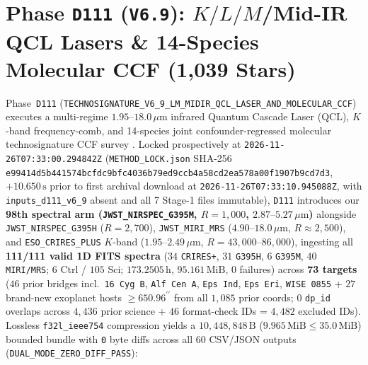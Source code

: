 \documentclass[twocolumn,10pt]{article}
\begin{document}
\section{Phase \texttt{D111} (\texttt{V6.9}): $K/L/M$/Mid-IR QCL Lasers \& 14-Species Molecular CCF (1,039 Stars)}
\label{sec:d111}
Phase~\texttt{D111} (\texttt{TECHNOSIGNATURE\_\allowbreak V6\_9\_\allowbreak LM\_\allowbreak MIDIR\_\allowbreak QCL\_\allowbreak LASER\_\allowbreak AND\_\allowbreak MOLECULAR\_\allowbreak CCF}) executes a multi-regime $1.95\text{--}18.0\,\mu\text{m}$ infrared Quantum Cascade Laser (QCL), $K$-band frequency-comb, and 14-species joint confounder-regressed molecular technosignature CCF survey \cite{Townes1983,HaqqMisra2022,Kaltenegger2021,Dorn2023,Jakobsen2022,Wright2023}. Locked prospectively at \texttt{2026-11-26T07:33:00.294842Z} (\texttt{METHOD\_LOCK.json} SHA-256 \texttt{e99414d5\allowbreak b441574b\allowbreak cfdc9bfc\allowbreak 4036b79e\allowbreak d9ccb4a5\allowbreak 8cd2ea57\allowbreak 8a00f190\allowbreak 7b9cd7d3}, $+10.650\,\text{s}$ prior to first archival download at \texttt{2026-11-26T07:33:10.945088Z}, with \texttt{inputs\_d111\_v6\_9} absent and all 7 Stage-1 files immutable), \texttt{D111} introduces our \textbf{98th spectral arm (\texttt{JWST\_NIRSPEC\_G395M}, $R=1{,}000$, $2.87\text{--}5.27\,\mu\text{m}$)} alongside \texttt{JWST\_NIRSPEC\_G395H} ($R=2{,}700$), \texttt{JWST\_MIRI\_MRS} ($4.90\text{--}18.0\,\mu\text{m}$, $R\approx 2{,}500$), and \texttt{ESO\_CRIRES\_PLUS} $K$-band ($1.95\text{--}2.49\,\mu\text{m}$, $R=43{,}000\text{--}86{,}000$), ingesting all \textbf{111/111 valid 1D FITS spectra} ($34$ \texttt{CRIRES+}, $31$ \texttt{G395H}, $6$ \texttt{G395M}, $40$ \texttt{MIRI/MRS}; $6$ Ctrl / $105$ Sci; $173.2505\,\text{h}$, $95.161\,\mathrm{MiB}$, $0$ failures) across \textbf{73 targets} ($46$ prior bridges incl.\ \texttt{16\,Cyg\,B}, \texttt{Alf\,Cen\,A}, \texttt{Eps\,Ind}, \texttt{Eps\,Eri}, \texttt{WISE\,0855} + $27$ brand-new exoplanet hosts $\ge 650.96^{\prime\prime}$ from all $1{,}085$ prior coords; $0$ \texttt{dp\_id} overlaps across $4{,}436$ prior science + $46$ format-check IDs = $4{,}482$ excluded IDs). Lossless \texttt{f32l\_ieee754} compression yields a $10{,}448{,}848\,\text{B}$ ($9.965\,\mathrm{MiB} \le 35.0\,\mathrm{MiB}$) bounded bundle with \texttt{0} byte diffs across all 60 CSV/JSON outputs (\texttt{DUAL\_MODE\_ZERO\_DIFF\_PASS}):
\end{document}
